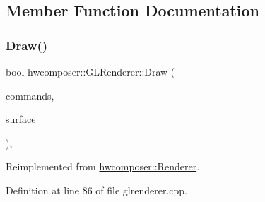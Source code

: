 \subsection{Member Function Documentation}
\mbox{\label{classhwcomposer_1_1GLRenderer_a961208b3640ffb78a15438ca4504fe1a}} 
\subsubsection{\texorpdfstring{Draw()}{Draw()}}
{\footnotesize\ttfamily bool hwcomposer\+::\+G\+L\+Renderer\+::\+Draw (\begin{DoxyParamCaption}\item[{const std\+::vector$<$ \mbox{\hyperlink{structhwcomposer_1_1RenderState}{Render\+State}} $>$ \&}]{commands,  }\item[{\mbox{\hyperlink{classhwcomposer_1_1NativeSurface}{Native\+Surface}} $\ast$}]{surface }\end{DoxyParamCaption})\hspace{0.3cm}{\ttfamily [override]}, {\ttfamily [virtual]}}



Reimplemented from \mbox{\hyperlink{classhwcomposer_1_1Renderer_ab147e6d44d429c0ada5a3212ef7100f1}{hwcomposer\+::\+Renderer}}.



Definition at line 86 of file glrenderer.\+cpp.


